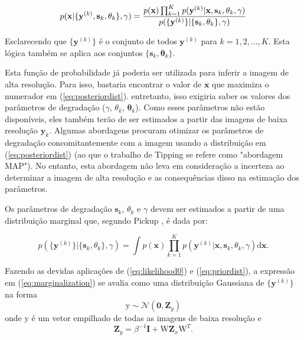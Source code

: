 \begin{equation}
	\label{eq:posteriordist}
	p(\mathbf{x}|\{\mathbf{y}^{(k)},\mathbf{s}_k,\theta_k\}, \gamma) = 
	\frac{p(\mathbf{x})\prod^K_{k=1} p(\mathbf{y}^{(k)}|\mathbf{x},\mathbf{s}_k,\theta_k, \gamma)}
	{p(\{\mathbf{y}^{(k)}\}|\{\mathbf{s}_k,\mathbf{\theta}_k\},\gamma)} \\
\end{equation}


Esclarecendo que $\{\mathbf{y}^{(k)}\}$ é o conjunto de todos $\mathbf{y}^{(k)}$ para $k = 1,2,...,K$.
Esta lógica também se aplica aos conjuntos $\{\mathbf{s}_k,\mathbf{\theta}_k\}$.

Esta função de probabilidade já poderia ser utilizada para inferir a imagem de alta resolução.
Para isso, bastaria encontrar o valor de $\mathbf{x}$ que maximiza o numerador em (\ref{eq:posteriordist}). entretanto, isso exigiria saber os valores dos parâmetros de degradação ($\gamma$, $\theta_k$, $\mathbf{\theta}_k$).
Como esses parâmetros não estão disponíveis, eles também terão de ser estimados a partir das imagens de baixa resolução $\mathbf{y}_k$. 
Algumas abordagens procuram otimizar os parâmetros de degradação concomitantemente com a imagem usando a distribuição em (\ref{eq:posteriordist}) (ao que o trabalho de Tipping \cite{tipping2003bayesian} se refere como "abordagem MAP"). No entanto, esta abordagem não leva em consideração a incerteza ao determinar a imagem de alta resolução e as consequências disso na estimação dos parâmetros.

Os parâmetros de degradação $\mathbf{s}_k$, $\theta_k$ e $\gamma$ devem ser estimados a partir de uma distribuição marginal que, segundo Pickup \cite{pickup2007bayesian2}, é dada por:

\begin{equation}
	\label{eq:marginalization}
	p(\{\mathbf{y}^{(k)}\} | \{\mathbf{s}_k, \theta_k \}, \gamma) = 
	\int  p(\mathbf{x})\prod^K_{k=1} p(\mathbf{y}^{(k)}|\mathbf{x},\mathbf{s}_k,\theta_k, \gamma) \mathrm{d}\mathbf{x}.
\end{equation}

Fazendo as devidas aplicações de (\ref{eq:likelihood0}) e (\ref{eq:priordist}), a expressão em (\ref{eq:marginalization}) se avalia como uma distribuição Gaussiana de $\{\mathbf{y}^{(k)}\}$ na forma
\begin{equation}
	\mathrm{y} \sim \mathcal{N}(\mathbf{0}, \mathbf{Z}_y)
\end{equation}
onde $\mathrm{y}$ é um vetor empilhado de todas as imagens de baixa resolução e
\begin{equation}
	\mathbf{Z}_y = \beta^{-1} \mathbf{I} + \mathrm{W} \mathbf{Z}_x \mathrm{W}^T.
\end{equation}


